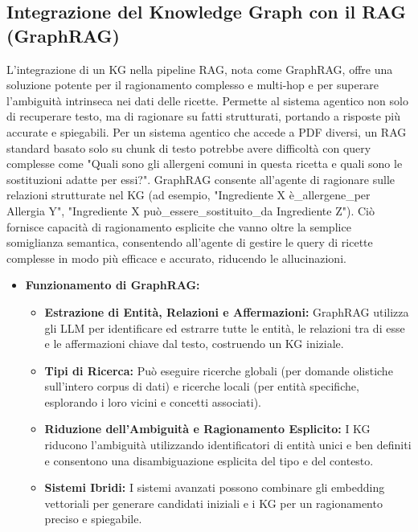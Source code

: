 \documentclass[a4paper, 11pt]{article}
\begin{document}
\subsection{Integrazione del Knowledge Graph con il RAG (GraphRAG)}
L'integrazione di un KG nella pipeline RAG, nota come GraphRAG, offre una soluzione potente per il ragionamento complesso e multi-hop e per superare l'ambiguità intrinseca nei dati delle ricette. \cite{graphrag_explained} Permette al sistema agentico non solo di recuperare testo, ma di ragionare su fatti strutturati, portando a risposte più accurate e spiegabili. Per un sistema agentico che accede a PDF diversi, un RAG standard basato solo su chunk di testo potrebbe avere difficoltà con query complesse come "Quali sono gli allergeni comuni in questa ricetta e quali sono le sostituzioni adatte per essi?". \cite{ingredient_substitutions_kg} GraphRAG consente all'agente di ragionare sulle relazioni strutturate nel KG (ad esempio, "Ingrediente X è\_allergene\_per Allergia Y", "Ingrediente X può\_essere\_sostituito\_da Ingrediente Z"). Ciò fornisce capacità di ragionamento esplicite che vanno oltre la semplice somiglianza semantica, consentendo all'agente di gestire le query di ricette complesse in modo più efficace e accurato, riducendo le allucinazioni. \cite{kg_beyond_retrieval}
\begin{itemize}
    \item \textbf{Funzionamento di GraphRAG:}
    \begin{itemize}
        \item \textbf{Estrazione di Entità, Relazioni e Affermazioni:} GraphRAG utilizza gli LLM per identificare ed estrarre tutte le entità, le relazioni tra di esse e le affermazioni chiave dal testo, costruendo un KG iniziale. \cite{graphrag_explained}
        \item \textbf{Tipi di Ricerca:} Può eseguire ricerche globali (per domande olistiche sull'intero corpus di dati) e ricerche locali (per entità specifiche, esplorando i loro vicini e concetti associati). \cite{graphrag_explained}
        \item \textbf{Riduzione dell'Ambiguità e Ragionamento Esplicito:} I KG riducono l'ambiguità utilizzando identificatori di entità unici e ben definiti e consentono una disambiguazione esplicita del tipo e del contesto. \cite{what_is_entity_linking_ontotext}
        \item \textbf{Sistemi Ibridi:} I sistemi avanzati possono combinare gli embedding vettoriali per generare candidati iniziali e i KG per un ragionamento preciso e spiegabile. \cite{kg_beyond_retrieval}
    \end{itemize}
\end{itemize}
\end{document}

